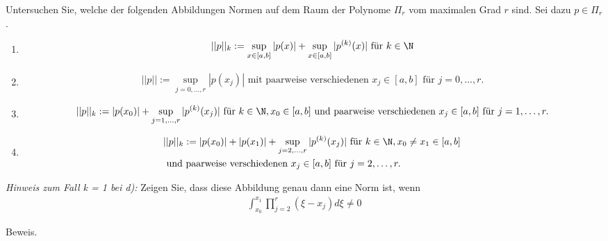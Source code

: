 \begin{exercise}
Untersuchen Sie, welche der folgenden Abbildungen Normen auf dem Raum der Polynome
$\Pi_r$ vom maximalen Grad $r$ sind. Sei dazu $p \in \Pi_r$.
\begin{enumerate}[label = \textbf{\alph*)}]
  \item \begin{align*}
    ||p||_k := \sup_{x \in [a,b]} |p(x)| + \sup_{x \in [a,b]}|p^{(k)}(x)|
    \text{ für } k \in \N
      \end{align*}
  \item \begin{align*}
    ||p|| := \sup_{j = 0,\dots,r} |p(x_j)| \text { mit paarweise verschiedenen }
    x_j \in [a,b] \text{ für } j = 0,\dots,r.
    \end{align*}
  \item \begin{align*}
    ||p||_k := |p(x_0)| + \sup_{j = 1,\dots,r}|p^{(k)}(x_j)| \text{ für } k \in \N,
    x_0 \in [a,b] \text{ und paarweise verschiedenen } x_j \in [a,b] \text{ für }
    j = 1,\dots,r.
    \end{align*}
  \item \begin{align*}
    &||p||_k := |p(x_0)| + |p(x_1)| + \sup_{j = 2,\dots,r} |p^{(k)}(x_j)| \text{ für }
    k \in \N, x_0 \neq x_1 \in [a,b] \\
     &\text{ und paarweise verschiedenen } x_j \in [a,b] \text{ für } j = 2,\dots,r.
  \end{align*}
\end{enumerate}
\textit{Hinweis zum Fall k = 1 bei d):} Zeigen Sie, dass diese Abbildung genau
dann eine Norm ist, wenn
\begin{align*}
  \int_{x_0}^{x_1} \prod_{j=2}^r \left(\xi - x_j\right)d\xi \neq 0
\end{align*}
\end{exercise}
\begin{solution}
Beweis.
\end{solution}
